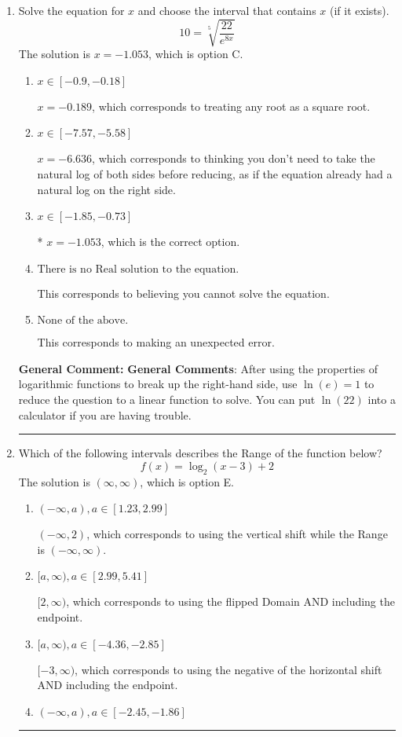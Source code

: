 \documentclass{extbook}[14pt]
\newcommand{\litem}[1]{\item #1

\rule{\textwidth}{0.4pt}}
\begin{document}
\begin{enumerate}\litem{
 Solve the equation for $x$ and choose the interval that contains $x$ (if it exists).
\[  10 = \sqrt[5]{\frac{22}{e^{8x}}} \]The solution is \( x = -1.053 \), which is option C.\begin{enumerate}[label=\Alph*.]
\item \( x \in [-0.9, -0.18] \)

$x = -0.189$, which corresponds to treating any root as a square root.
\item \( x \in [-7.57, -5.58] \)

$x = -6.636$, which corresponds to thinking you don't need to take the natural log of both sides before reducing, as if the equation already had a natural log on the right side.
\item \( x \in [-1.85, -0.73] \)

* $x = -1.053$, which is the correct option.
\item \( \text{There is no Real solution to the equation.} \)

This corresponds to believing you cannot solve the equation.
\item \( \text{None of the above.} \)

This corresponds to making an unexpected error.
\end{enumerate}

\textbf{General Comment:} \textbf{General Comments}: After using the properties of logarithmic functions to break up the right-hand side, use $\ln(e) = 1$ to reduce the question to a linear function to solve. You can put $\ln(22)$ into a calculator if you are having trouble.
}
\litem{
Which of the following intervals describes the Range of the function below?
\[ f(x) = \log_2{(x-3)}+2 \]The solution is \( (\infty, \infty) \), which is option E.\begin{enumerate}[label=\Alph*.]
\item \( (-\infty, a), a \in [1.23, 2.99] \)

$(-\infty, 2)$, which corresponds to using the vertical shift while the Range is $(-\infty, \infty)$.
\item \( [a, \infty), a \in [2.99, 5.41] \)

$[2, \infty)$, which corresponds to using the flipped Domain AND including the endpoint.
\item \( [a, \infty), a \in [-4.36, -2.85] \)

$[-3, \infty)$, which corresponds to using the negative of the horizontal shift AND including the endpoint.
\item \( (-\infty, a), a \in [-2.45, -1.86] \)


\end{enumerate}}
\end{enumerate}
\end{document}
